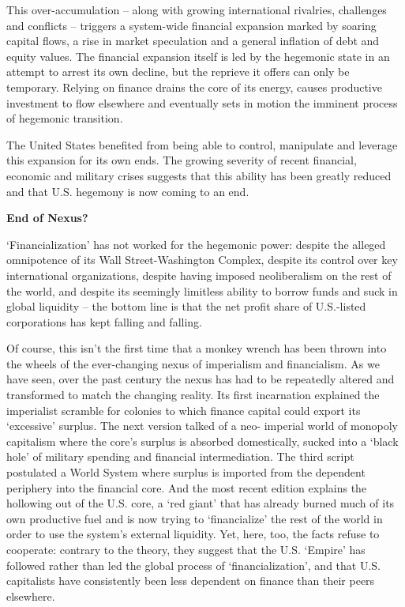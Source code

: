 \documentclass[
]{book}
\begin{document}
This over-accumulation -- along with growing international rivalries,
challenges and conflicts -- triggers a system-wide financial expansion marked by soaring
capital flows, a rise in market speculation and a general inflation of debt and equity
values.
The financial expansion itself is led by the hegemonic state in an attempt to
arrest its own decline, but the reprieve it offers can only be temporary. Relying on finance
drains the core of its energy, causes productive investment to flow elsewhere and
eventually sets in motion the imminent process of hegemonic transition.

The United States benefited from being able to control,
manipulate and leverage this expansion for its own ends.
The growing severity of recent financial, economic and military crises suggests
that this ability has been greatly reduced and that U.S. hegemony is now coming to an end.

\textbf{End of Nexus?}

`Financialization' has not worked for the hegemonic power: despite the alleged
omnipotence of its Wall Street-Washington Complex, despite its control over key
international organizations, despite having imposed neoliberalism on the rest of the
world, and despite its seemingly limitless ability to borrow funds and suck in global
liquidity -- the bottom line is that the net profit share of U.S.-listed corporations has kept
falling and falling.

Of course, this isn't the first time that a monkey wrench has been thrown into the wheels
of the ever-changing nexus of imperialism and financialism. As we have seen, over the past
century the nexus has had to be repeatedly altered and transformed to match the
changing reality. Its first incarnation explained the imperialist scramble for colonies to
which finance capital could export its `excessive' surplus. The next version talked of a neo-
imperial world of monopoly capitalism where the core's surplus is absorbed domestically,
sucked into a `black hole' of military spending and financial intermediation. The third
script postulated a World System where surplus is imported from the dependent
periphery into the financial core. And the most recent edition explains the hollowing out
of the U.S. core, a `red giant' that has already burned much of its own productive fuel and
is now trying to `financialize' the rest of the world in order to use the system's external
liquidity.
Yet, here, too, the facts refuse to cooperate: contrary to the theory, they suggest
that the U.S. `Empire' has followed rather than led the global process of `financialization',
and that U.S. capitalists have consistently been less dependent on finance than their peers
elsewhere.
\end{document}
